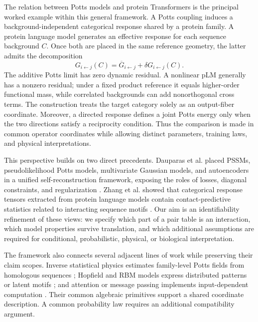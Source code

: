 \documentclass[10pt]{article}
\theoremstyle{definition}
\theoremstyle{remark}
\begin{document}
The relation between Potts models and protein Transformers is the principal worked example within
this general framework.  A Potts coupling induces a
background-independent categorical response shared by a protein family.  A protein language model
generates an effective response for each sequence background $C$.  Once both are placed in
the same reference geometry, the latter admits the decomposition
\begin{equation}
\boxed{
G_{i\leftarrow j}(C)
=\overline G_{i\leftarrow j}+\delta G_{i\leftarrow j}(C).}
\label{eq:central-thesis}
\end{equation}
The additive Potts limit has zero dynamic residual.  A nonlinear pLM generally has a nonzero
residual; under a fixed product reference it equals higher-order functional mass, while correlated
backgrounds can add nonorthogonal cross terms.  The construction treats the target category solely
as an output-fiber coordinate.  Moreover, a directed response defines a joint
Potts energy only when the two directions satisfy a reciprocity condition.  Thus the comparison is
made in common operator coordinates while allowing distinct parameters, training laws, and physical
interpretations.

This perspective builds on two direct precedents.  Dauparas et al. placed PSSMs,
pseudolikelihood Potts models, multivariate Gaussian models, and autoencoders in a unified
self-reconstruction framework, exposing the roles of losses, diagonal constraints, and
regularization \cite{dauparas2019}.  Zhang et al. showed that categorical response tensors
extracted from protein language models contain contact-predictive statistics related to interacting
sequence motifs \cite{zhang2024motifs}.  Our aim is an identifiability refinement of these views:
we specify which part of a pair table is an interaction, which model properties survive translation,
and which additional assumptions are required for conditional, probabilistic, physical, or
biological interpretation.

The framework also connects several adjacent lines of work while preserving their claim scopes.  Inverse
statistical physics estimates family-level Potts fields from homologous sequences
\cite{morcos2011,ekeberg2013,cocco2018}; Hopfield and RBM models express distributed patterns or
latent motifs \cite{hopfield1982,tubiana2019}; and attention or message passing implements
input-dependent computation \cite{gilmer2017,vaswani2017,ramsauer2021}.  Their common algebraic
primitives support a shared coordinate description.  A common probability law requires an
additional compatibility argument.
\end{document}
